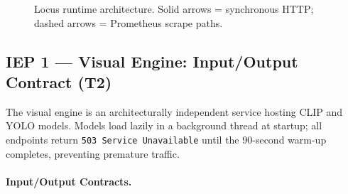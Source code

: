 \documentclass[12pt]{article}
\begin{document}
\begin{figure}[H]
\caption{Locus runtime architecture. Solid arrows = synchronous HTTP; dashed arrows = Prometheus scrape paths.}
\label{fig:arch}
\end{figure}

\subsection{IEP 1 --- Visual Engine: Input/Output Contract (T2)}

The visual engine is an architecturally independent service hosting CLIP and YOLO models. Models load lazily in a background thread at startup; all endpoints return \texttt{503 Service Unavailable} until the 90-second warm-up completes, preventing premature traffic.

\paragraph{Input/Output Contracts.}
\end{document}
